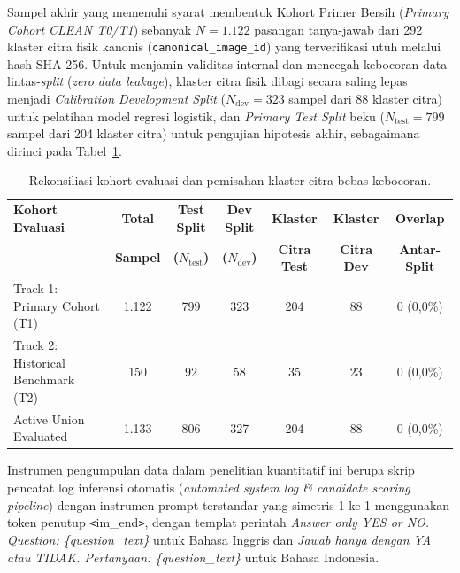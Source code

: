 \documentclass[a4paper,10pt,twoside]{article}
\begin{document}
Sampel akhir yang memenuhi syarat membentuk Kohort Primer Bersih (\textit{Primary Cohort CLEAN T0/T1}) sebanyak $N = 1.122$ pasangan tanya-jawab dari 292 klaster citra fisik kanonis (\texttt{canonical\_image\_id}) yang terverifikasi utuh melalui hash SHA-256. Untuk menjamin validitas internal dan mencegah kebocoran data lintas-\textit{split} (\textit{zero data leakage}), klaster citra fisik dibagi secara saling lepas menjadi \textit{Calibration Development Split} ($N_{\mathrm{dev}} = 323$ sampel dari 88 klaster citra) untuk pelatihan model regresi logistik, dan \textit{Primary Test Split} beku ($N_{\mathrm{test}} = 799$ sampel dari 204 klaster citra) untuk pengujian hipotesis akhir, sebagaimana dirinci pada Tabel~\ref{tab:kohort}.

\begin{table}[htbp]
\centering
\caption{Rekonsiliasi kohort evaluasi dan pemisahan klaster citra bebas kebocoran.}
\label{tab:kohort}
\vspace{0.3em}
\footnotesize
\begin{tabular}{lcccccc}
\toprule
\textbf{Kohort Evaluasi} & \textbf{Total} & \textbf{Test Split} & \textbf{Dev Split} & \textbf{Klaster} & \textbf{Klaster} & \textbf{Overlap} \\
 & \textbf{Sampel} & \textbf{($N_{\mathrm{test}}$)} & \textbf{($N_{\mathrm{dev}}$)} & \textbf{Citra Test} & \textbf{Citra Dev} & \textbf{Antar-Split} \\
\midrule
Track 1: Primary Cohort (T1) & 1.122 & 799 & 323 & 204 & 88 & 0 (0,0\%) \\
Track 2: Historical Benchmark (T2) & 150 & 92 & 58 & 35 & 23 & 0 (0,0\%) \\
Active Union Evaluated & 1.133 & 806 & 327 & 204 & 88 & 0 (0,0\%) \\
\bottomrule
\end{tabular}
\end{table}

Instrumen pengumpulan data dalam penelitian kuantitatif ini berupa skrip pencatat log inferensi otomatis (\textit{automated system log \& candidate scoring pipeline}) dengan instrumen prompt terstandar yang simetris 1-ke-1 menggunakan token penutup \verb|<|im\_end\verb|>|, dengan templat perintah \textit{Answer only YES or NO. Question: \{question\_text\}} untuk Bahasa Inggris dan \textit{Jawab hanya dengan YA atau TIDAK. Pertanyaan: \{question\_text\}} untuk Bahasa Indonesia.
\end{document}
